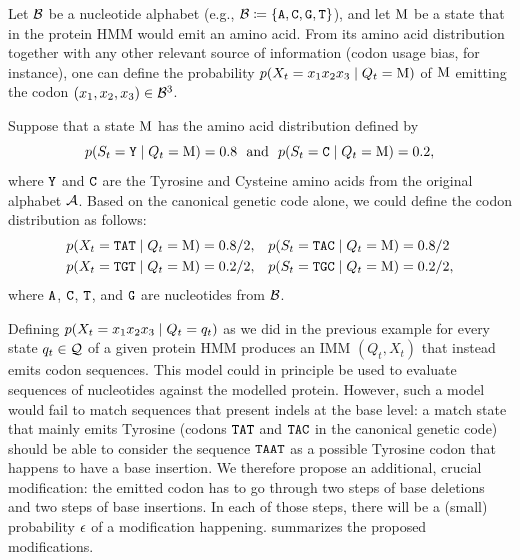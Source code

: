 Let $\mathcal{B}$ be a nucleotide alphabet (e.g., $\mathcal{B} \coloneqq \{\mathtt{A}, \mathtt{C}, \mathtt{G},
\mathtt{T}\}$), and let $\mathrm{M}$ be a state that in the protein HMM would emit an amino acid. From
its amino acid distribution together with any other relevant source of information (codon usage
bias, for instance), one can define the probability $p(X_t=x_1x_2x_3 \;|\; Q_t=\mathrm{M})$ of
$\mathrm{M}$ emitting the codon $(x_1, x_2, x_3) \in \mathcal{B}^3$.

\begin{example}
  Suppose that a state $\mathrm{M}$ has the amino acid distribution defined by
  \begin{equation*}
    p(S_t=\mathtt{Y} \;|\; Q_t=\mathrm{M}) = 0.8 ~~\text{and}~~ p(S_t=\mathtt{C} \;|\; Q_t=\mathrm{M}) = 0.2,
  \end{equation*}
  where $\mathtt{Y}$ and $\mathtt{C}$ are the Tyrosine and Cysteine amino acids from the original alphabet
  $\mathcal{A}$. Based on the canonical genetic code alone, we could define the codon distribution as
  follows:
  \begin{equation*}
    \begin{split}
      p(X_t=\mathtt{TAT}\;|\; Q_t=\mathrm{M})= 0.8/2, &\quad p(S_t=\mathtt{TAC}\;|\; Q_t=\mathrm{M})=0.8/2\\
      p(X_t=\mathtt{TGT}\;|\; Q_t=\mathrm{M})= 0.2/2, &\quad p(S_t=\mathtt{TGC}\;|\; Q_t=\mathrm{M})=0.2/2,
    \end{split}
  \end{equation*}
  where $\mathtt{A}$, $\mathtt{C}$, $\mathtt{T}$, and $\mathtt{G}$ are nucleotides from $\mathcal{B}$.
\end{example}

Defining $p(X_t=x_1x_2x_3 \;|\; Q_t=q_t)$ as we did in the previous example for every state $q_t \in
\mathcal{Q}$ of a given protein HMM produces an IMM $(Q_t, X_t)$ that instead emits codon sequences.
This model could in principle be used to evaluate sequences of nucleotides against the modelled
protein. However, such a model would fail to match sequences that present indels at the base level:
a match state that mainly emits Tyrosine (codons $\mathtt{TAT}$ and $\mathtt{TAC}$ in the canonical
genetic code) should be able to consider the sequence $\mathtt{TAAT}$ as a possible Tyrosine codon that
happens to have a base insertion. We therefore propose an additional, crucial modification: the
emitted codon has to go through two steps of base deletions and two steps of base insertions. In
each of those steps, there will be a (small) probability $\epsilon$ of a modification happening.
 summarizes the proposed modifications.

